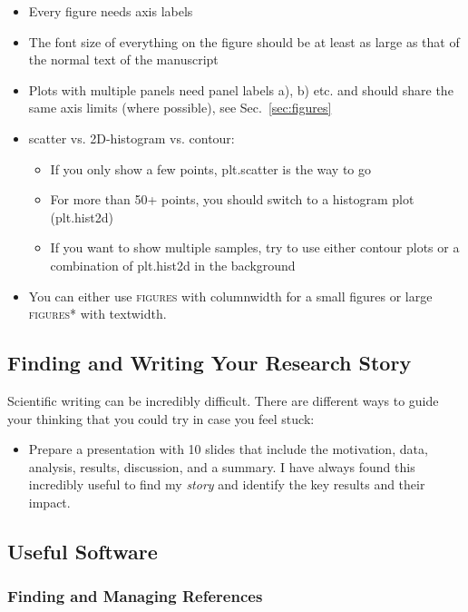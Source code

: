 \documentclass[fleqn,usenatbib]{mnras}
\begin{document}
\begin{itemize}
    \item Every figure needs axis labels
    \item The font size of everything on the figure should be at least as large as that of the normal text of the manuscript
    \item Plots with multiple panels need panel labels a), b) etc. and should share the same axis limits (where possible), see Sec.~\ref{sec:figures}
    \item scatter vs. 2D-histogram vs. contour:
    \begin{itemize}
        \item If you only show a few points, plt.scatter is the way to go
        \item For more than 50+ points, you should switch to a histogram plot (plt.hist2d)
        \item If you want to show multiple samples, try to use either contour plots or a combination of plt.hist2d in the background
    \end{itemize}    
    \item You can either use \textsc{figures} with columnwidth for a small figures or large \textsc{figures*} with textwidth.
\end{itemize}

\subsection{Finding and Writing Your Research Story}

Scientific writing can be incredibly difficult. There are different ways to guide your thinking that you could try in case you feel stuck:
\begin{itemize}
    \item Prepare a presentation with 10 slides that include the motivation, data, analysis, results, discussion, and a summary. I have always found this incredibly useful to find my \textit{story} and identify the key results and their impact.
\end{itemize}

\subsection{Useful Software}

\subsubsection{Finding and Managing References}
\end{document}
